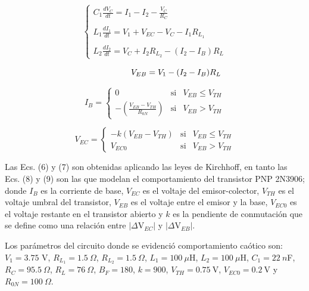 \documentclass{article}
\begin{document}
\begin{equation}
 \left\lbrace\begin{array}{lcc}
 
  C_{1}\frac{dV_{C}}{dt} = I_{1}-I_{2}-\frac{V_{C}}{R_{C}} \\\\  
   L_{1}\frac{dI_{1}}{dt} = V_{1}+V_{EC}-V_{C}- I_{1}R_{L_1} \\\\ 
  L_{2}\frac{dI_{2}}{dt} = V_{C}+I_{2}R_{L_2}-(I_{2}- I_{B})R_{L} \end{array}\right. 
\label{eq:one}
\end{equation}

\begin{equation}
 \left. \hspace{1.8cm} V_{EB} = V_{1}-(I_{2}-I_{B})R_{L} \right.   
  \label{eq:two}
 \end{equation}


\begin{equation}
I_{B}=\left\{ \begin{array}{ccc} 0  &  \mathrm{si}  & V_{EB}\leq V_{TH} \\ -(\frac{V_{EB}-V_{TH}}{R_{0N}})&    \mathrm{si}  &   V_{EB}>{V_{TH}} \end{array}\right. 
\end{equation}


\begin{equation}
V_{EC}=\left\lbrace\begin{array}{ccc} -k(V_{EB}-V_{TH})&  \mathrm{si}  & V_{EB}\leq  V_{TH} \\  V_{EC0}&    \mathrm{si}  &V_{EB}>{V_{TH}} \end{array}\right. 
  \label{eq:four}
\end{equation}





Las Ecs. (6) y (7) son obtenidas aplicando las leyes de Kirchhoff, en tanto las Ecs. (8) y (9) son las  que modelan el comportamiento del transistor PNP 2N3906; donde $I_B$ es la corriente de base, $V_{EC}$ es el voltaje del emisor-colector, $V_{TH}$ es el voltaje umbral del transistor, $V_{EB}$ es el voltaje entre el emisor  y la base, $V_{EC0}$ es el voltaje restante en el transistor abierto y $k$ es la pendiente de conmutación que  se define como una relación entre   $|\Delta$V$_{EC}$$|$ y $|\Delta$V$_{EB}$$|$. 

Los parámetros del circuito donde se evidenció comportamiento caótico  son:
\mbox{$V_{1}= 3.75$} V, $R_{L_1}=1.5\ \Omega$, \mbox{$R_{L_2}= 1.5\ \Omega$}, $L_{1}= 100\ \mu$H, $L_{2}= 100\ \mu$H,
\mbox{$C_{1}= 22\ n$F}, \mbox{$R_{C}= 95.5\ \Omega$}, $R_{L}= 76\ \Omega$, $B_{F}= 180$,
$k = 900$, \mbox{$V_{TH}= 0.75\  $V}, $V_{EC0}= 0.2\  $V y $R_{0N}= 100\ \Omega $.
\end{document}
